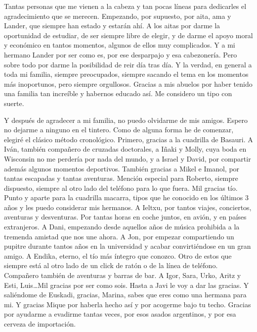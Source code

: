 
\begin{acknowledgementslong} 

Tantas personas que me vienen a la cabeza y tan pocas líneas para dedicarles
el agradecimiento que se merecen. Empezando, por supuesto, por aita, ama y Lander,
que siempre han estado y estarán ahí. A los aitas por darme la oportunidad de 
estudiar, de ser siempre libre de elegir, y de darme el apoyo moral y económico 
en tantos momentos, algunos de ellos muy complicados. Y a mi hermano Lander por 
ser como es, por ese desparpajo y esa cabezonería. Pero sobre todo por darme la 
posibilidad de reir día tras día. Y la verdad, en general a toda mi familia, 
siempre preocupados, siempre sacando el tema en los momentos más inoportunos, 
pero siempre orgullosos. Gracias a mis abuelos por haber tenido una familia tan 
increíble y habernos educado así. Me considero un tipo con suerte.

Y después de agradecer a mi familia, no puedo olvidarme de mis amigos. Espero
no dejarme a ninguno en el tintero. Como de alguna forma he de comenzar, elegiré 
el clásico método cronológico. Primero, gracias a la cuadrilla de Basauri. A Iván,
también compañero de cruzadas doctorales, a Iñaki y Molly, cuya boda en Wisconsin
no me perdería por nada del mundo, y a Israel y David, por compartir además algunos
momentos deportivos. También gracias a Mikel e Imanol, por tantas escapadas y 
tantas aventuras. Mención especial para Roberto, siempre dispuesto, siempre al 
otro lado del teléfono para lo que fuera. Mil gracias tío. Punto y aparte para
la cuadrilla macarra, tipos que he conocido en los últimos 3 años y les puedo
considerar mis hermanos. A Ieltxu, por tantos viajes, conciertos, aventuras y 
desventuras. Por tantas horas en coche juntos, en avión, y en países extranjeros.
A Dani, empezando desde aquellos años de música prohibida a la tremenda 
amistad que nos une ahora. A Jon, por empezar compartiendo un pupitre durante 
tantos años en la universidad y acabar convirtiéndose en un gran amigo. A Endika, 
eterno, el tío más íntegro que conozco. Otro de estos que siempre está al otro lado
de un click de ratón o de la línea de teléfono. Compañero también de aventuras y 
barras de bar. A Igor, Sara, Urko, Aritz y Esti, Luis\dots Mil gracias por ser 
como sois. Hasta a Javi le voy a dar las gracias. Y saliéndome de Euskadi, 
gracias, Marina, sabes que eres como una hermana para mi. Y gracias Mique por 
haberla hecho así y por acogerme bajo tu techo. Gracias por ayudarme a evadirme 
tantas veces, por esos asados argentinos, y por esa cerveza de importación.


\end{acknowledgementslong}

